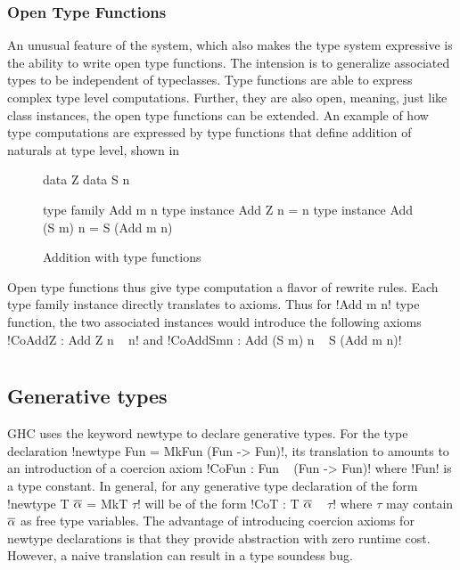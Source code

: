 \documentclass[manuscript,screen,nonacm]{acmart}
\begin{document}
\subsubsection{Open Type Functions}
An unusual feature of the system, which also makes the type system expressive is the ability to write open type functions. The intension is to generalize associated types to be independent of typeclasses. Type functions are able to express complex type level computations. Further, they are also open, meaning, just like class instances, the open type functions can be extended. An example of how type computations are expressed by type functions that define addition of naturals at type level, shown in 
\begin{figure}[ht]
  \begin{minipage}[ht]{0.4\linewidth}
    \begin{code}
      data Z
      data S n
    \end{code}
  \end{minipage}%
  \begin{minipage}[ht]{0.4\linewidth}
    \begin{code}
      type family Add m n
      type instance Add Z n = n
      type instance Add (S m) n = S (Add m n)
    \end{code}
  \end{minipage}
  \caption{Addition with type functions}
  \label{fig:open-type-fun-add}
\end{figure}
Open type functions thus give type computation a flavor of rewrite rules.
Each type family instance directly translates to axioms. Thus for !Add m n! type function, the two associated instances would introduce the following axioms !CoAddZ : Add Z n ~ n! and !CoAddSmn : Add (S m) n ~ S (Add m n)!



\section{\SFR}\label{sec:sfr} %
\subsection{Generative types}
GHC uses the keyword newtype to declare generative types. For the type declaration !newtype Fun = MkFun (Fun -> Fun)!, its translation to \SFC amounts to an introduction of a coercion axiom !CoFun : Fun ~ (Fun -> Fun)! where !Fun! is a type constant. In general, for any generative type declaration of the form !newtype T $\overline{\alpha}$ = MkT $\tau$! will be of the form !CoT : T $\overline{\alpha}$ ~ $\tau$! where $\tau$ may contain $\overline{\alpha}$ as free type variables. The advantage of introducing coercion axioms for newtype declarations is that they provide abstraction with zero runtime cost. However,
a naive translation can result in a type soundess bug\cite{TODO}.
\end{document}
